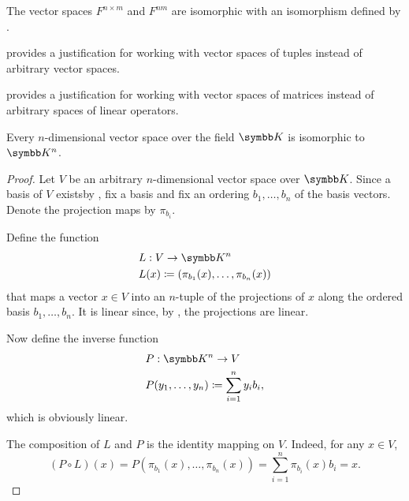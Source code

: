 \begin{proposition}\label{def:matrix_spaces_are_tuple_spaces}
  The vector spaces \( F^{n \times m} \) and \( F^{nm} \) are isomorphic with an isomorphism defined by .
\end{proposition}

\begin{remark}\label{remark:vector_spaces_of_tuples_and_matrices}
   provides a justification for working with vector spaces of tuples instead of arbitrary vector spaces.

   provides a justification for working with vector spaces of matrices instead of arbitrary spaces of linear operators.
\end{remark}

\begin{theorem}\label{thm:finite_dimensional_spaces_are_isomorphic}
  Every \( n \)-dimensional vector space over the field \( \BK \) is isomorphic to \( \BK^n \).
\end{theorem}
\begin{proof}
  Let \( V \) be an arbitrary \( n \)-dimensional vector space over \( \BK \). Since a basis of \( V \) exists\AOC by , fix a basis and fix an ordering \( b_1, \ldots, b_n \) of the basis vectors. Denote the projection maps by \( \pi_{b_i} \).

  Define the function
  \begin{align*}
    &L: V \to \BK^n \\
    &L(x) \coloneqq (\pi_{b_1}(x), \ldots, \pi_{b_n}(x))
  \end{align*}
  that maps a vector \( x \in V \) into an \( n \)-tuple of the projections of \( x \) along the ordered basis \( b_1, \ldots, b_n \). It is linear since, by , the projections are linear.

  Now define the inverse function
  \begin{align*}
    &P: \BK^n \to V \\
    &P(y_1, \ldots, y_n) \coloneqq \sum_{i=1}^n y_i b_i,
  \end{align*}
  which is obviously linear.

  The composition of \( L \) and \( P \) is the identity mapping on \( V \). Indeed, for any \( x \in V \),
  \begin{equation*}
    (P \circ L)(x)
    =
    P(\pi_{b_1}(x), \ldots, \pi_{b_n}(x))
    =
    \sum_{i=1}^n \pi_{b_i}(x) b_i
    =
    x.
  \end{equation*}
\end{proof}

